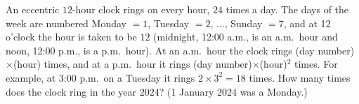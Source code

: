 An eccentric $12$-hour clock rings on every hour, $24$ times a day. The days of the week are numbered Monday $=1$, Tuesday $=2$, $\dots$, Sunday $=7$, and at 12 o'clock the hour is taken to be $12$ (midnight, 12:00 a.m., is an a.m.\ hour and noon, 12:00 p.m., is a p.m.\ hour). At an a.m.\ hour the clock rings (day number)$\times$(hour) times, and at a p.m.\ hour it rings (day number)$\times$(hour)$^2$ times. For example, at 3:00 p.m.\ on a Tuesday it rings $2\times3^2=18$ times. How many times does the clock ring in the year $2024$? (1 January 2024 was a Monday.)
